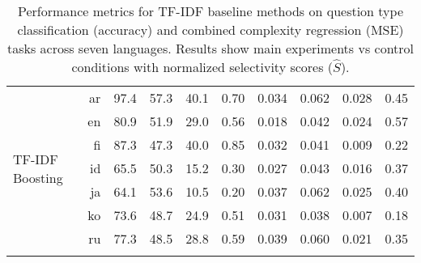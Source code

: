 \documentclass[11pt]{article}
\begin{document}
\begin{table}[H]
{\begin{tabular}{p{2.5cm}rcccccccc}
        \multirow{7}{2.5cm}{\centering\small TF-IDF Boosting} & ar & 97.4 & 57.3 & 40.1 & \multicolumn{1}{c|}{0.70} & 0.034 & 0.062 & 0.028 & 0.45 \\
        & en & 80.9 & 51.9 & 29.0 & \multicolumn{1}{c|}{0.56} & 0.018 & 0.042 & 0.024 & 0.57 \\
        & fi & 87.3 & 47.3 & 40.0 & \multicolumn{1}{c|}{0.85} & 0.032 & 0.041 & 0.009 & 0.22 \\
        & id & 65.5 & 50.3 & 15.2 & \multicolumn{1}{c|}{0.30} & 0.027 & 0.043 & 0.016 & 0.37 \\
        & ja & 64.1 & 53.6 & 10.5 & \multicolumn{1}{c|}{0.20} & 0.037 & 0.062 & 0.025 & 0.40 \\
        & ko & 73.6 & 48.7 & 24.9 & \multicolumn{1}{c|}{0.51} & 0.031 & 0.038 & 0.007 & 0.18 \\
        & ru & 77.3 & 48.5 & 28.8 & \multicolumn{1}{c|}{0.59} & 0.039 & 0.060 & 0.021 & 0.35 \\\hhline{*{10}{-}}
        
    \end{tabular}
    } 
    \centering
        \caption{Performance metrics for TF-IDF baseline methods on question type classification (accuracy) and combined complexity regression (MSE) tasks across seven languages. Results show main experiments vs control conditions with normalized selectivity scores ($\widehat{S}$).}
    \label{tab:tfidf_performance}
\end{table}
\end{document}
